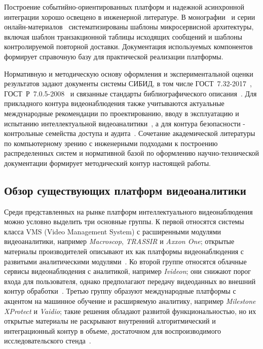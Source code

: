 Построение событийно-ориентированных платформ и надежной асинхронной интеграции хорошо освещено в инженерной литературе. В монографии~\cite{richardson_microservices} и серии онлайн-материалов~\cite{transactional_outbox,rabbitmq_dlq} систематизированы шаблоны микросервисной архитектуры, включая шаблон транзакционной таблицы исходящих сообщений и шаблоны контролируемой повторной доставки. Документация используемых компонентов~\cite{fastapi_docs,sqlalchemy_docs,rabbitmq_docs,rabbitmq_confirms,postgresql_docs,docker_docs,prometheus_docs,grafana_docs} формирует справочную базу для практической реализации платформы.

Нормативную и методическую основу оформления и экспериментальной оценки результатов задают документы системы СИБИД, в том числе ГОСТ~7.32-2017~\cite{gost_732_2017}, ГОСТ~Р~7.0.5-2008~\cite{gost_r_705_2008} и связанные стандарты библиографического описания~\cite{gost_71_2003,gost_780_2000,gost_782_2001}. Для прикладного контура видеонаблюдения также учитываются актуальные международные рекомендации по проектированию, вводу в эксплуатацию и испытанию интеллектуальной видеоаналитики~\cite{iec_62676_4_2025,iec_62676_6_2026}, а для контура безопасности - контрольные семейства доступа и аудита~\cite{nist_sp800_53r5}. Сочетание академической литературы по компьютерному зрению с инженерными подходами к построению распределенных систем и нормативной базой по оформлению научно-технической документации формирует методический контур настоящей работы.

\subsection{Обзор существующих платформ видеоаналитики}

Среди представленных на рынке платформ интеллектуального видеонаблюдения можно условно выделить три основные группы. К первой относятся системы класса VMS (Video Management System) с расширенными модулями видеоаналитики, например \textit{Macroscop}, \textit{TRASSIR} и \textit{Axxon One}; открытые материалы производителей описывают их как платформы видеонаблюдения с развитыми аналитическими модулями~\cite{macroscop_site,trassir_site,axxon_one}. Ко второй группе относятся облачные сервисы видеонаблюдения с аналитикой, например \textit{Ivideon}; они снижают порог входа для пользователя, однако предполагают передачу видеоданных во внешний контур обработки~\cite{ivideon_analytics}. Третью группу образуют международные платформы с акцентом на машинное обучение и расширяемую аналитику, например \textit{Milestone XProtect} и \textit{Vaidio}; такие решения обладают развитой функциональностью, но их открытые материалы не раскрывают внутренний алгоритмический и интеграционный контур в объеме, достаточном для воспроизводимого исследовательского стенда~\cite{milestone_xprotect,vaidio_platform}.

